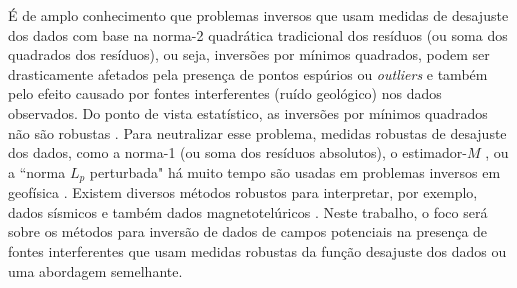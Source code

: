 É de amplo conhecimento que problemas inversos que usam medidas de desajuste dos dados com base na norma-2 quadrática tradicional dos resíduos (ou soma dos quadrados dos resíduos), ou seja, inversões por mínimos quadrados, podem ser drasticamente afetados pela presença de pontos espúrios ou \textit{outliers} e também pelo efeito causado por fontes interferentes (ruído geológico) nos dados observados.
Do ponto de vista estatístico, as inversões por mínimos quadrados não são robustas \citep{huber1964, scales_gersztenkorn1988}.
Para neutralizar esse problema, medidas robustas de desajuste dos dados, como a norma-1 (ou soma dos resíduos absolutos), o estimador-$ M $ \citep{huber1964}, ou a ``norma $ L_ {p} $ perturbada" \citep{ekblom1973} há muito tempo são usadas em problemas inversos em geofísica \citep{farquharson_oldenburg1998}.
Existem diversos métodos robustos para interpretar, por exemplo, dados sísmicos \citep[por exemplo,][]{claerbout_muir1973, scales_gersztenkorn1988, crase_etal1990, amundsen1991, guitton_symes2003, ji2012, dasilva2020} e também dados magnetotelúricos \citep[por exemplo,][]{egbert_booker1986, chave_etal1987, sutarno_vozoff1991, larsen_etal1996, matsuno_etal2014}.
Neste trabalho, o foco será sobre os métodos para inversão de dados de campos potenciais na presença de fontes interferentes que usam medidas robustas da função desajuste dos dados ou uma abordagem semelhante.

